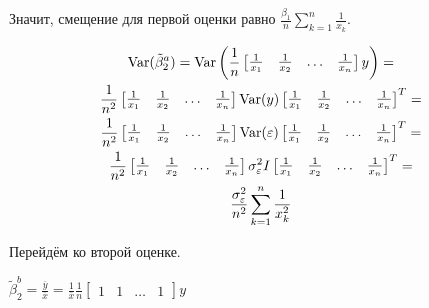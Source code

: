 \documentclass[pdftex,11pt,openany]{book}
\begin{document}
\begin{solution}
Значит, смещение для первой оценки равно $\frac{\beta_1}{n}\sum_{k=1}^n \frac{1}{x_k}$.

\begin{multline}
\operatorname{Var}(\tilde{\beta}_2^a) = \operatorname{Var}\left(\frac{1}{n} \begin{bmatrix}
\frac{1}{x_1} & \frac{1}{x_2} & \ldots & \frac{1}{x_n}
\end{bmatrix} y\right) =\\
 \frac{1}{n^2} \begin{bmatrix}
\frac{1}{x_1} & \frac{1}{x_2} & \ldots & \frac{1}{x_n}
\end{bmatrix} \operatorname{Var}(y) \begin{bmatrix}
\frac{1}{x_1} & \frac{1}{x_2} & \ldots & \frac{1}{x_n}
\end{bmatrix}^T =\\
\frac{1}{n^2} \begin{bmatrix}
\frac{1}{x_1} & \frac{1}{x_2} & \ldots & \frac{1}{x_n}
\end{bmatrix} \operatorname{Var}(\varepsilon) \begin{bmatrix}
\frac{1}{x_1} & \frac{1}{x_2} & \ldots & \frac{1}{x_n}
\end{bmatrix}^T = \\
 \frac{1}{n^2} \begin{bmatrix}
\frac{1}{x_1} & \frac{1}{x_2} & \ldots & \frac{1}{x_n}
\end{bmatrix} \sigma_{\varepsilon}^2 I \begin{bmatrix}
\frac{1}{x_1} & \frac{1}{x_2} & \ldots & \frac{1}{x_n}
\end{bmatrix}^T =\\
\frac{\sigma^2_{\varepsilon}}{n^2}\sum_{k=1}^n \frac{1}{x_k^2}
\end{multline}

Перейдём ко второй оценке.

$\tilde{\beta}_2^b = \frac{\overline{y}}{\overline{x}} = \frac{1}{\overline{x}} \frac{1}{n} \begin{bmatrix}
1 & 1 & \ldots & 1
\end{bmatrix} y$



\end{solution}
\end{document}

